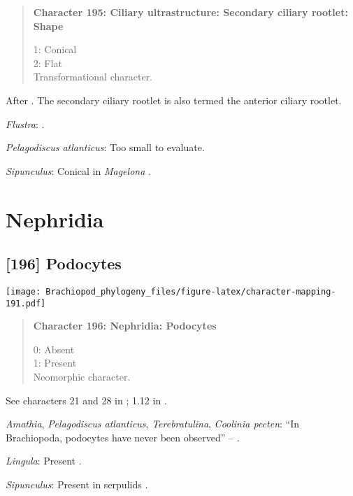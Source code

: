\documentclass[openany]{book}
\theoremstyle{definition}
\theoremstyle{definition}
\theoremstyle{definition}
\theoremstyle{remark}
\begin{document}
\begin{quote}
\textbf{Character 195: Ciliary ultrastructure: Secondary ciliary
rootlet: Shape}

1: Conical\\
2: Flat\\
Transformational character.
\end{quote}

After \citet{Lundin2009}. The secondary ciliary rootlet is also termed
the anterior ciliary rootlet.

\hypertarget{Flustra-coding-195}{}
\emph{Flustra}: \citet{Reed1982}.

\hypertarget{Pelagodiscus_atlanticus-coding-195}{}
\emph{Pelagodiscus atlanticus}: Too small to evaluate.

\hypertarget{Sipunculus-coding-195}{}
\emph{Sipunculus}: Conical in \emph{Magelona} \citep{Bartolomaeus1995}.

\section{Nephridia}\label{nephridia}

\subsection*{{[}196{]} Podocytes}\label{podocytes}

\texttt{[image: Brachiopod\_phylogeny\_files/figure-latex/character-mapping-191.pdf]}

\begin{quote}
\textbf{Character 196: Nephridia: Podocytes}

0: Absent\\
1: Present\\
Neomorphic character.
\end{quote}

See characters 21 and 28 in \citet{Haszprunar2000}; 1.12 in
\citet{Scheltema1993}.

\hypertarget{Amathia-coding-196}{}
\emph{Amathia}, \emph{Pelagodiscus atlanticus}, \emph{Terebratulina},
\emph{Coolinia pecten}: ``In Brachiopoda, podocytes have never been
observed'' -- \citet{Luter1995}.

\hypertarget{Lingula-coding-196}{}
\emph{Lingula}: Present \citep{Storch1978}.

\hypertarget{Sipunculus-coding-196}{}
\emph{Sipunculus}: Present in serpulids \citep{Bartolomaeus2005}.
\end{document}
